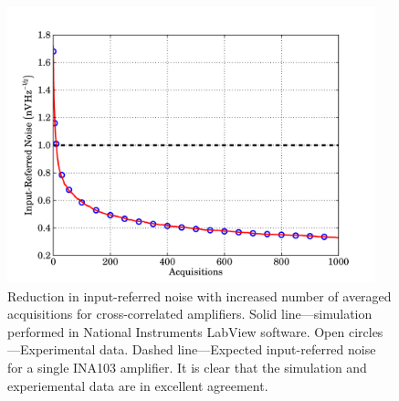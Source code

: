 \begin{figure}[tb]
\begin{center}
\includegraphics[width = 0.95\textwidth]{figures/crossColNoiseSimData}
\caption[Reduction in input-referred noise with increased number of averaged acquisitions for cross-correlated amplifiers]{Reduction in input-referred noise with increased number of averaged acquisitions for cross-correlated amplifiers. Solid line---simulation performed in National Instruments LabView software. Open circles---Experimental data. Dashed line---Expected input-referred noise for a single INA103 amplifier. It is clear that the simulation and experiemental data are in excellent agreement.}
\label{fig:crossCol_NoiseSimData}
\end{center}
\end{figure}
